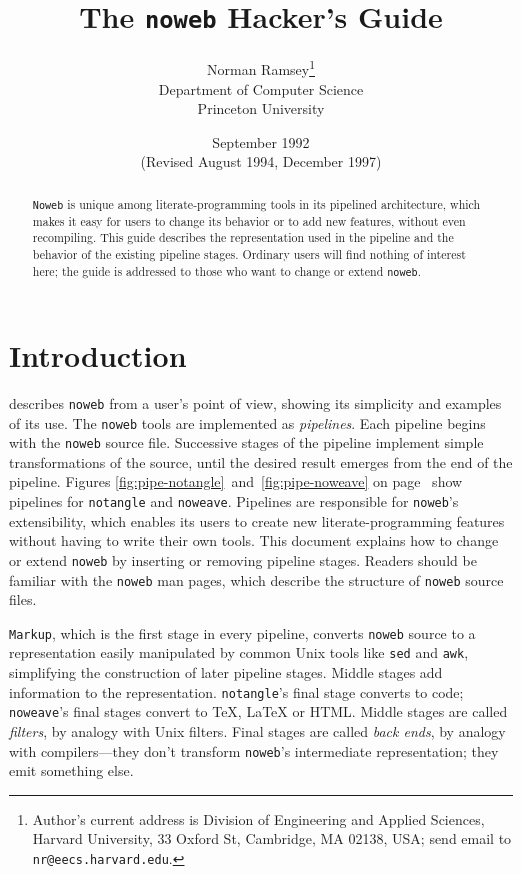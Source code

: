 \documentclass{article}
\title{The {\tt noweb} Hacker's Guide}
\author{Norman Ramsey\thanks{Author's current address is Division of
Engineering and Applied Sciences,
  Harvard University, 33 Oxford St, Cambridge, MA 02138, USA;
send email to {\tt nr@eecs.harvard.edu}.}\\Department of Computer Science\\
Princeton University}
\date{September 1992\\(Revised August 1994, December 1997)}
\begin{document}
\maketitle

\begin{abstract}
{\tt Noweb} is unique among literate-programming tools in its
pipelined architecture, which makes it easy for users to change
its behavior or to add new features, without even recompiling.
This guide describes the representation used in the
pipeline and the behavior of the existing pipeline stages.
Ordinary users will find nothing of interest here; the guide is
addressed to those who want to change or extend {\tt noweb}.
\end{abstract}

\clearpage

\tableofcontents
\listoftables

\newpage

\section{Introduction}

 describes {\tt {\tt noweb}} from a user's
point of view, showing its simplicity and examples of its use.
The {\tt {\tt noweb}} tools are implemented as {\em pipelines}.
Each pipeline begins with the {\tt noweb}
source file.  Successive stages of the pipeline implement simple
transformations of the source, until the desired result emerges from
the end of the pipeline.  Figures
\ref{fig:pipe-notangle}~and~\ref{fig:pipe-noweave} on
page~\pageref{fig:pipe-notangle} show pipelines for
{\tt notangle} and {\tt noweave}.  
Pipelines are responsible for {\tt {\tt noweb}}'s
extensibility, which enables its users to create new literate-programming
features without having to write their own tools.
This document explains how to change or extend {\tt noweb} by
inserting or removing pipeline stages.
Readers should be familiar with the {\tt {\tt noweb}} man pages, which
describe the structure of {\tt {\tt noweb}} source files.

{\tt Markup}, which is the first stage in
every pipeline, converts {\tt noweb} source to a representation easily
manipulated by common Unix tools like {\tt sed} and {\tt awk}, simplifying
the construction of later pipeline stages.  Middle stages add
information to the representation.  {\tt notangle}'s final stage converts to
code; {\tt noweave}'s final stages convert to TeX, LaTeX or HTML.
Middle stages are called {\em filters}, by analogy with Unix filters.
Final stages are called {\em back ends}, by analogy with
compilers---they don't transform {\tt {\tt noweb}}'s intermediate
representation; they emit something else.
\end{document}
